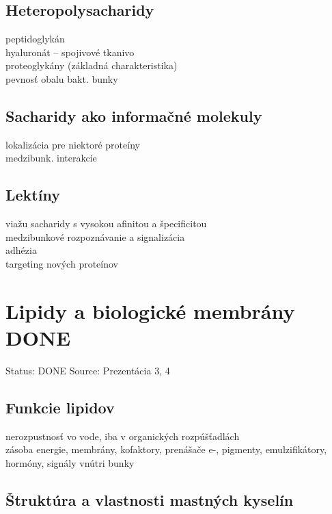 \subsection{Heteropolysacharidy}
peptidoglykán\\
hyaluronát -- spojivové tkanivo\\
proteoglykány (základná charakteristika)\\
\tab pevnosť obalu bakt. bunky\\
\subsection{Sacharidy ako informačné molekuly}
lokalizácia pre niektoré proteíny\\
medzibunk. interakcie\\
\subsection{Lektíny}
viažu sacharidy s vysokou afinitou a špecificitou\\
medzibunkové rozpoznávanie a signalizácia\\
adhézia\\
targeting nových proteínov\\

\section{Lipidy a biologické membrány DONE}

Status: DONE
Source: Prezentácia 3, 4

\subsection{Funkcie lipidov}
nerozpustnosť vo vode, iba v organických rozpúšťadlách\\
zásoba energie, membrány, kofaktory, prenášače e-, pigmenty, emulzifikátory, hormóny, signály vnútri bunky\\
\subsection{Štruktúra a vlastnosti mastných kyselín}

